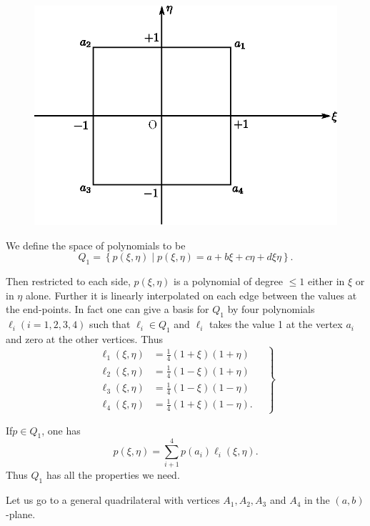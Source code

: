 \begin{figure}[H]
\centering
\includegraphics{figures/fig52-11.1.eps}
\caption{}\label{c11:fig11.1}
\end{figure}

We define the space of polynomials to be
$$
Q_1 = \left\{ p(\xi, \eta) \mid p(\xi, \eta) = a + b\xi + c \eta + d
\xi \eta\right\}.  
$$

Then restricted to each side, $p(\xi, \eta)$ is a polynomial of degree
$\leq 1$ either in $\xi$ or in $\eta$ alone. Further it is linearly
interpolated on each edge between the values at the end-points. In
fact one can give a basis for $Q_1$ by four polynomials $\ell_i
(i=1,2,3,4)$ such that $\ell_i \in Q_1$ and $\ell_i$ takes the value 1
at the vertex $a_i$ and zero at the other vertices. Thus  
\begin{equation*}
\left.
\begin{aligned}
\ell_1 (\xi, \eta) & = \frac{1}{4} (1+\xi) (1+\eta) \quad \\
\ell_2 (\xi, \eta) & = \frac{1}{4} (1-\xi) (1+\eta) \quad \\
\ell_3 (\xi, \eta) & = \frac{1}{4} (1-\xi) (1-\eta) \quad \\
\ell_4 (\xi, \eta) & = \frac{1}{4} (1+\xi) (1-\eta). \quad 
\end{aligned}
\right\}\tag{11.11}\label{eq11.11}
\end{equation*}

If\pageoriginale $p \in Q_1$, one has
$$
p(\xi, \eta) = \sum\limits^4_{i+1} p(a_i) \ell_i (\xi, \eta).
$$
Thus $Q_1$ has all the properties we need.

Let us go to a general quadrilateral with vertices $A_1, A_2, A_3$ and $A_4$ in the $(a,b)$-plane.

